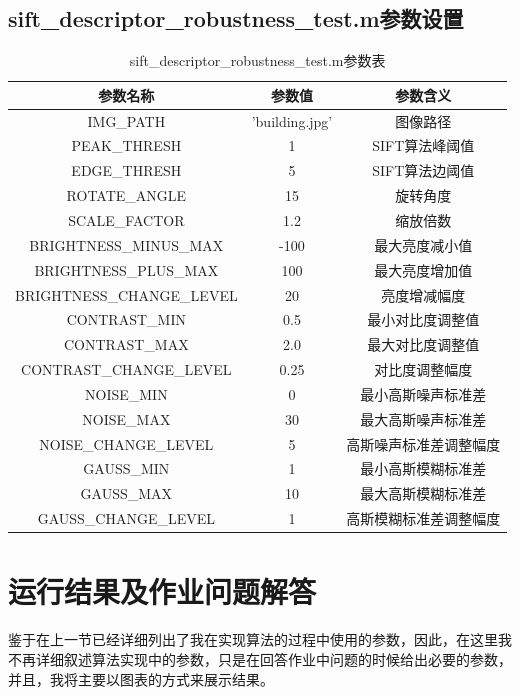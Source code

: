 \documentclass[a4paper, UTF8]{ctexrep}
\begin{document}
    \subsection{sift\_descriptor\_robustness\_test.m参数设置}
      \begin{table}[htbp!]
        \centering
        \begin{tabular}{ccc}
        \hline
        参数名称 & 参数值 & 参数含义 \\
        \hline
        IMG\_PATH & 'building.jpg' & 图像路径 \\
        PEAK\_THRESH & 1 & SIFT算法峰阈值 \\
        EDGE\_THRESH & 5 & SIFT算法边阈值 \\
        ROTATE\_ANGLE & 15 & 旋转角度 \\
        SCALE\_FACTOR & 1.2 & 缩放倍数 \\
        BRIGHTNESS\_MINUS\_MAX & -100 & 最大亮度减小值 \\
        BRIGHTNESS\_PLUS\_MAX & 100 & 最大亮度增加值 \\
        BRIGHTNESS\_CHANGE\_LEVEL & 20 & 亮度增减幅度 \\
        CONTRAST\_MIN & 0.5 & 最小对比度调整值 \\
        CONTRAST\_MAX & 2.0 & 最大对比度调整值 \\
        CONTRAST\_CHANGE\_LEVEL & 0.25 & 对比度调整幅度 \\
        NOISE\_MIN & 0 & 最小高斯噪声标准差 \\
        NOISE\_MAX & 30 & 最大高斯噪声标准差 \\
        NOISE\_CHANGE\_LEVEL & 5 & 高斯噪声标准差调整幅度 \\
        GAUSS\_MIN & 1 & 最小高斯模糊标准差 \\
        GAUSS\_MAX & 10 & 最大高斯模糊标准差 \\
        GAUSS\_CHANGE\_LEVEL & 1 & 高斯模糊标准差调整幅度 \\
        \hline
        \end{tabular}
        \caption{sift\_descriptor\_robustness\_test.m参数表}
      \end{table}

	\section{运行结果及作业问题解答}
		鉴于在上一节已经详细列出了我在实现算法的过程中使用的参数，因此，在这里我不再详细叙述算法实现中的参数，只是在回答作业中问题的时候给出必要的参数，并且，我将主要以图表的方式来展示结果。
\end{document}
